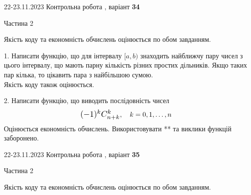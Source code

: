 \documentclass[12pt, ukrainian]{article}
\begin{document}
{{{{{\begin {Large}
\end{Large}\newpage




\begin {Huge}
{{22-23.11.2023 Контрольна робота , варіант  \No \textbf { 34 }\par}}

\begin{center}Частина 2
\end{center}
\vspace{10mm}
\end {Huge}

{
\begin {Large}
Якість коду та економність обчислень оцінюється по обом завданням.

\vspace{5mm}

1. Написати функцію, що для інтервалу $[a, b)$ знаходить найближчу пару чисел з цього інтервалу, що мають парну кількість різних простих дільників. Якщо таких пар кілька, то цікавить пара з найбільшою сумою.\\	Якість коду також оцінюється. 



\vspace{10mm}



2. 
Написати функцію, що виводить послідовність чисел
$$\scalebox{1.2}{$(-1)^{k}C_{n+k}^{k}$}, \quad k=0,1,\ldots,n$$
Оцінюється економність обчислень. Використовувати ** та виклики функцій заборонено.

\end{Large}\newpage




\begin {Huge}
{{22-23.11.2023 Контрольна робота , варіант  \No \textbf { 35 }\par}}

\begin{center}Частина 2
\end{center}
\vspace{10mm}
\end {Huge}

{
\begin {Large}
Якість коду та економність обчислень оцінюється по обом завданням.

\vspace{5mm}


\end{Large}}}}}}}}
\end{document}
